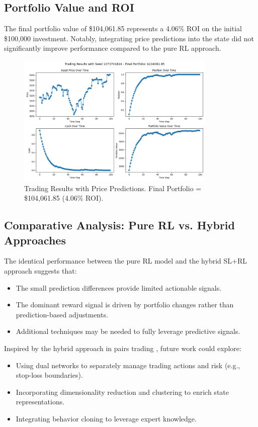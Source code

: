 \documentclass[11pt]{article}
\begin{document}
\subsection{Portfolio Value and ROI}
The final portfolio value of \$104,061.85 represents a 4.06\% ROI on the initial \$100,000 investment. Notably, integrating price predictions into the state did not significantly improve performance compared to the pure RL approach.

\begin{figure}[h]
  \centering
  \includegraphics[width=0.85\textwidth]{fig/m2_dqn_with_sl.png}
  \caption{Trading Results with Price Predictions. Final Portfolio = \$104,061.85 (4.06\% ROI).}
  \label{fig:trading_results_m2}
\end{figure}

\subsection{Comparative Analysis: Pure RL vs. Hybrid Approaches}
The identical performance between the pure RL model and the hybrid SL+RL approach suggests that:
\begin{itemize}
  \item The small prediction differences provide limited actionable signals.
  \item The dominant reward signal is driven by portfolio changes rather than prediction-based adjustments.
  \item Additional techniques may be needed to fully leverage predictive signals.
\end{itemize}
Inspired by the hybrid approach in pairs trading \citep{kim2022hybrid}, future work could explore:
\begin{itemize}
  \item Using dual networks to separately manage trading actions and risk (e.g., stop-loss boundaries).
  \item Incorporating dimensionality reduction and clustering to enrich state representations.
  \item Integrating behavior cloning to leverage expert knowledge.
\end{itemize}
\end{document}
